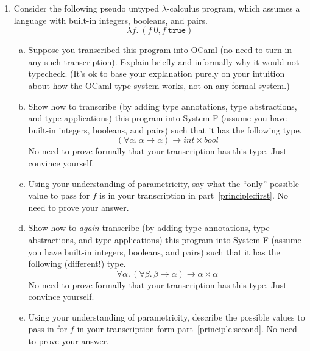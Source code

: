 \documentclass{article}
\theoremstyle{definition}
\newcommand{\meta}[1]{{\color{blue}#1}}
\begin{document}
\begin{enumerate}[start=1,label={{\bf Problem \arabic*}.},ref=\arabic*,left=0pt..0pt,widest*=10,align=left,itemindent=*]
\begin{proof}
\begin{itemize}
    \end{itemize}
  \end{proof}
  \begin{quote}
    If $\cdot;\cdot\vdash\meta{e}:\meta{\tau}$, then $FTV(\meta{\tau}) = \emptyset$.
  \end{quote}
  \begin{proof}
    Suppose $FTV(\meta{\tau}) \neq \emptyset$, then $\exists \meta{\beta} \in FTV(\meta{\tau})$. According to $\textit{Lemma 1-1}$, $\cdot\vdash\meta{\beta}$. However, $\meta{\Delta}$ in this case is an empty set, this contradicts with $\cdot\vdash\meta{\beta}$. Therefore, $FTV(\meta{\tau})$ must be $\emptyset$.
  \end{proof}

\item Consider the following pseudo untyped $\lambda$-calculus program, which assumes a language with built-in integers, booleans, and pairs.
  \[
    \lambda f.\ (f\ 0, f\ \mathtt{true})
  \]
  \begin{enumerate}[(a),left=1em]
  \item Suppose you transcribed this program into OCaml (no need to turn in any
    such transcription). Explain briefly and informally why it would not
    typecheck. (It's ok to base your explanation purely on your intuition about
    how the OCaml type system works, not on any formal system.)
  \item\label{principle:first} Show how to transcribe (by adding type
    annotations, type abstractions, and type applications) this program into
    System F (assume you have built-in integers, booleans, and pairs) such that
    it has the following type.
    \[
      (\forall\alpha.\, \alpha\to\alpha)\to int\times bool
    \]
    No need to prove formally that your transcription has this type. Just convince yourself.
  \item Using your understanding of parametricity, say what the ``only''
    possible value to pass for $f$ is in your transcription in part~\ref{principle:first}.
    No need to prove your answer.
  \item\label{principle:second} Show how to \emph{again} transcribe (by adding type
    annotations, type abstractions, and type applications) this program into
    System F (assume you have built-in integers, booleans, and pairs) such that
    it has the following (different!) type.
    \[
      \forall\alpha.\, (\forall\beta.\, \beta\to\alpha)\to \alpha\times\alpha
    \]
    No need to prove formally that your transcription has this type. Just convince yourself.
  \item\label{principle:second-f} Using your understanding of parametricity, describe the possible values
    to pass in for $f$ in your transcription form part~\ref{principle:second}.
    No need to prove your answer.


\end{enumerate}
\end{enumerate}
\end{document}
